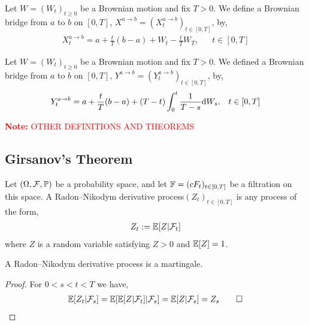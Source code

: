 \documentclass[12pt]{article}
\newcommand{\note}[1]{\textcolor{red}{\textbf{Note:} #1}}
\begin{document}
\begin{definition}
Let \( W = (W_t)_{t\geq 0} \) be a Brownian motion and fix \( T>0 \). We define a Brownian bridge from \( a \) to \( b \) on \( [0,T] \), \( X^{a\to b} = (X_t^{a\to b})_{t\in [0,T]} \), by,
\begin{align*}
    X_t^{a\to b} = a+\frac{t}{T}(b-a)+W_t-\frac{t}{T}W_T, && t\in[0,T]
\end{align*}
\end{definition}

\begin{definition}
Let \( W = (W_t)_{t\geq0} \) be a Brownian motion and fix \( T>0 \). We defined a Brownian bridge from \( a \) to \( b \) on \( [0,T] \), \( Y^{a\to b} = (Y_t^{a\to b})_{t\in[0,T]} \), by,
\begin{align*}
    Y_t^{a\to b} = a + \dfrac{t}{T}(b-a)+(T-t) \int_0^t \dfrac{1}{T-s}\mathrm{d} W_s, && t\in[0,T]
\end{align*}
\end{definition}

\note{OTHER DEFINITIONS AND THEOREMS}

\subsection{Girsanov's Theorem}

\begin{definition}
Let \( (\Omega,\mathcal{F},\mathbb{P}) \) be a probability space, and let \( \mathbb{F} = (cF_t)_{t\in[0,T]} \) be a filtration on this space. A Radon--Nikodym derivative process\( (Z_t)_{t\in[0,T]} \) is any process of the form,
\begin{align*}
    Z_t := \mathbb{E}[Z | \mathcal{F}_t]
\end{align*}
where \( Z \) is a random variable satisfying \( Z>0 \) and \( \mathbb{E}[Z] = 1 \).
\end{definition}

\begin{lemma}
A Radon--Nikodym derivative process is a martingale.
\end{lemma}

\begin{proof}
For \( 0<s<t<T \) we have,
\begin{align*}
    \EE[Z_t | \cF_s] = \EE[\EE[Z |\cF_t]|\cF_s] = \EE[Z|\cF_s]  = Z_s \tag*{\qed}
\end{align*}
\end{proof}
\end{document}
